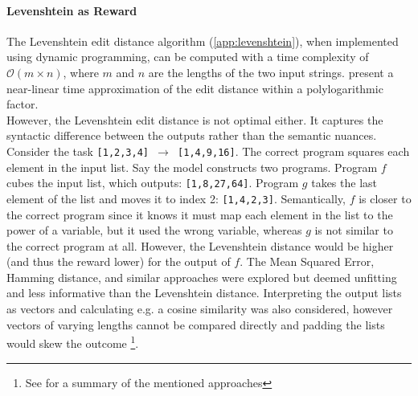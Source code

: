 \paragraph*{Levenshtein as Reward}
The Levenshtein edit distance algorithm (\autoref{app:levenshtein}), when implemented using dynamic programming, can be computed with a time complexity of $\mathcal{O}(m \times n)$, where $m$ and $n$ are the lengths of the two input strings. \citet{AndoniKO10} present a near-linear time approximation of the edit distance within a polylogarithmic factor. \\
However, the Levenshtein edit distance is not optimal either. It captures the syntactic difference between the outputs rather than the semantic nuances. Consider the task \texttt{[1,2,3,4] $\rightarrow$ [1,4,9,16]}. The correct program squares each element in the input list. Say the model constructs two programs. Program $f$ cubes the input list, which outputs: \texttt{[1,8,27,64]}. Program $g$ takes the last element of the list and moves it to index 2: \texttt{[1,4,2,3]}. Semantically, $f$ is closer to the correct program since it knows it must map each element in the list to the power of a variable, but it used the wrong variable, whereas $g$ is not similar to the correct program at all. However, the Levenshtein distance would be higher (and thus the reward lower) for the output of $f$.
The Mean Squared Error, Hamming distance, and similar approaches were explored but deemed unfitting and less informative than the Levenshtein distance. Interpreting the output lists as vectors and calculating e.g. a cosine similarity was also considered, however vectors of varying lengths cannot be compared directly and padding the lists would skew the outcome \footnote{See \citet{han2022data} for a summary of the mentioned approaches}.

